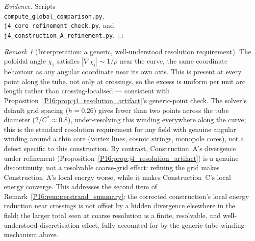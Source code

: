 \documentclass[11pt,a4paper]{article}
\theoremstyle{definition}\newtheorem{definition}[theorem]{Definition}
\theoremstyle{remark}
\newtheorem{remark}[theorem]{Remark}
\theoremstyle{definition}\newtheorem{construction}[theorem]{Construction}
\begin{document}
\begin{proof}[Evidence]
Scripts\\
\texttt{compute\_global\_comparison.py},\\
\texttt{j4\_core\_refinement\_check.py}, and\\
\texttt{j4\_construction\_A\_refinement.py}.
\end{proof}

\begin{remark}[Interpretation: a generic, well-understood resolution
  requirement]
\label{P16:rem:j4_resolution_interpretation}
The poloidal angle $\chi_i$ satisfies $|\nabla\chi_i|\sim1/\rho$ near
the curve, the same coordinate behaviour as any angular coordinate
near its own axis. This is present at every point along the tube, not
only at crossings, so the excess is uniform per unit arc length rather
than crossing-localised --- consistent with Proposition~\ref{P16:prop:j4_resolution_artifact}'s
generic-point check. The solver's default grid spacing ($h=0.26$)
gives fewer than two points across the tube diameter
($2/C^*\approx0.8$), under-resolving this winding everywhere along the
curve; this is the standard resolution requirement for any field with
genuine angular winding around a thin core (vortex lines, cosmic
strings, monopole cores), not a defect specific to this construction.
By contrast, Construction~A's divergence under refinement
(Proposition~\ref{P16:prop:j4_resolution_artifact}) is a genuine
discontinuity, not a resolvable coarse-grid effect: refining the grid
makes Construction~A's local energy worse, while it makes
Construction~C's local energy converge. This addresses the second item
of Remark~\ref{P16:rem:perstrand_summary}: the corrected construction's
local energy reduction near crossings is not offset by a hidden
divergence elsewhere in the field; the larger total seen at coarse
resolution is a finite, resolvable, and well-understood discretisation
effect, fully accounted for by the generic tube-winding mechanism
above.
\end{remark}
\end{document}
